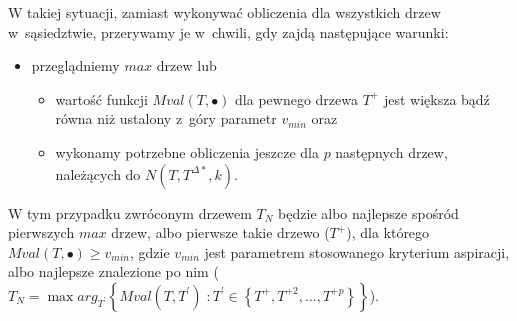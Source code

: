 W takiej sytuacji, zamiast wykonywać obliczenia dla wszystkich drzew w~sąsiedztwie, przerywamy je w~chwili, gdy zajdą następujące warunki:

\begin{itemize}
	\item przeglądniemy $max$ drzew lub
	\begin{itemize}
		\item wartość funkcji $Mval \left( T, \bullet \right)$ dla pewnego drzewa $T^{+}$ jest większa bądź równa niż ustalony z~góry parametr $v_{min}$ oraz
		\item wykonamy potrzebne obliczenia jeszcze dla $p$ następnych drzew, należących do $N \left( T, T^{\Delta\ast}, k \right)$.
	\end{itemize}
\end{itemize}

W tym przypadku zwróconym drzewem $T_{N}$ będzie albo najlepsze spośród pierwszych $max$ drzew, albo pierwsze takie drzewo ($T^{+}$), dla którego $Mval \left( T, \bullet \right) \geqslant v_{min}$, gdzie $v_{min}$ jest parametrem stosowanego kryterium aspiracji, albo najlepsze znalezione po nim ($T_{N} = \max arg_{T^{\prime}} \left\{ Mval \left( T, T^{\prime} \right) \; : T^{\prime} \in \left\{ T^{+}, T^{+2}, \dots, T^{+p} \right\} \right\}$).


